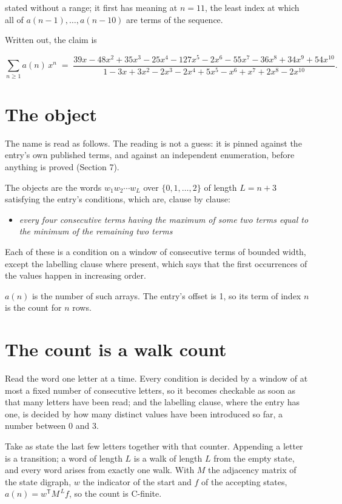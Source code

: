\documentclass[11pt]{article}
\theoremstyle{definition}
\begin{document}
stated without a range; it first has meaning at $n = 11$, the least index at which all of $a(n-1),\dots,a(n-10)$ are terms of the sequence.

Written out, the claim is

\[\sum_{n \ge 1} a(n)\,x^n \;=\; \frac{39x - 48x^{2} + 35x^{3} - 25x^{4} - 127x^{5} - 2x^{6} - 55x^{7} - 36x^{8} + 34x^{9} + 54x^{10}}{1 - 3x + 3x^{2} - 2x^{3} - 2x^{4} + 5x^{5} - x^{6} + x^{7} + 2x^{8} - 2x^{10}}.\]

\section{The object}

The name is read as follows. The reading is not a guess: it is pinned against the entry's own published terms, and against an independent enumeration, before anything is proved (Section 7).

The objects are the words $w_1 w_2 \cdots w_L$ over $\{0,1,\dots,2\}$ of length $L = n + 3$ satisfying the entry's conditions, which are, clause by clause:

\begin{itemize}

\item {\itshape every four consecutive terms having the maximum of some two terms equal to the minimum of the remaining two terms}

\end{itemize}

Each of these is a condition on a window of consecutive terms of bounded width, except the labelling clause where present, which says that the first occurrences of the values happen in increasing order.

$a(n)$ is the number of such arrays. The entry's offset is 1, so its term of index $n$ is the count for $n$ rows.

\section{The count is a walk count}

Read the word one letter at a time. Every condition is decided by a window of at most a fixed number of consecutive letters, so it becomes checkable as soon as that many letters have been read; and the labelling clause, where the entry has one, is decided by how many distinct values have been introduced so far, a number between $0$ and 3.

Take as state the last few letters together with that counter. Appending a letter is a transition; a word of length $L$ is a walk of length $L$ from the empty state, and every word arises from exactly one walk. With $M$ the adjacency matrix of the state digraph, $w$ the indicator of the start and $f$ of the accepting states, $a(n) = w^{\mathsf T}M^{\,L}f$, so the count is C-finite.
\end{document}
